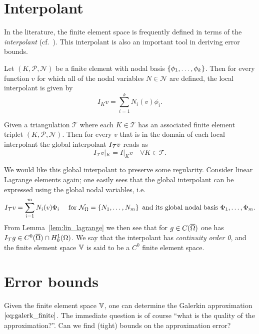 \documentclass[thesis.tex]{subfiles}
\begin{document}
\section{Interpolant}
\label{sec:apriori}
In the literature, the finite element space is frequently defined in terms of the \emph{interpolant} 
(cf.~\cite[Ch~3]{brenner}). This interpolant is also an important tool in deriving error bounds. 
  \begin{defn}
    Let $(K, \mathcal{P}, \mathcal{N})$ be a finite element with nodal basis $\set{\phi_1,\dots, \phi_k}$. Then for every function $v$ for which all of the nodal variables $N \in \mathcal{N}$ are defined, the local interpolant is given by
    \[
      I_K v = \sum_{i = 1}^k N_i(v)\phi_i.
    \]
  \end{defn}
  \begin{defn}
    Given a triangulation $\mathcal{T}$ where each $K \in \mathcal{T}$ has an associated 
    finite element triplet $(K, \mathcal{P}, \mathcal{N})$. Then for
    every $v$ that is in the domain of each local interpolant the global interpolant $I_{\mathcal{T}} v$ reads as
    \[
      I_{\mathcal{T}} v |_K = I|_K v \quad \forall K \in \mathcal{T}.
    \]
  \end{defn}
  We would like this global interpolant to preserve some regularity. Consider
  linear Lagrange elements again; one easily sees that the global interpolant can be expressed using the global nodal variables, i.e.
    \[
      I_{\mathcal{T}} v = \sum_{i=1}^m N_i(v)\Phi_i \quad \text{ for } \mathcal{N}_\Omega =\set{N_1, \dots, N_m} \text{ and its global nodal basis } \Phi_1,\dots,\Phi_m.
    \]
    From Lemma~\ref{lem:lin_lagrange} we then see that for $g \in C(\overline{\Omega})$ one has $I_{\mathcal{T}} g \in C^0(\overline{\Omega}) \cap H_0^1(\Omega)$. We say
    that the interpolant has \emph{continuity order 0}, and the finite element space $\mathbb{V}$ is said to be a $C^0$ finite element space.
  \section{Error bounds}
  Given the finite element space $\mathbb{V}$, one can determine the Galerkin approximation $\eqref{eq:galerk_finite}$. The immediate
  question is of course ``what is the quality of the approximation?''. Can we find (tight) bounds
  on the approximation error?
\end{document}
